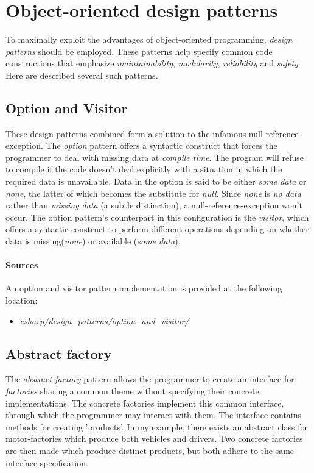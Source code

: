 \documentclass{article}
\begin{document}
\newpage


\section{Object-oriented design patterns}
To maximally exploit the advantages of object-oriented programming, {\em design patterns} should be employed. These patterns
help specify common code constructions that emphasize {\em maintainability}, {\em modularity}, {\em reliability} and
{\em safety}. Here are described several such patterns.

\subsection{Option and Visitor}
These design patterns combined form a solution to the infamous null-reference-exception. The {\em option} pattern offers a
syntactic construct that forces the programmer to deal with missing data at {\em compile time}. The program will refuse to
compile if the code doesn't deal explicitly with a situation in which the required data is unavailable. Data in the option
is said to be either {\em some data} or {\em none}, the latter of which becomes the substitute for {\em null}. Since {\em none}
is {\em no data} rather than {\em missing data} (a subtle distinction), a null-reference-exception won't occur. The option
pattern's counterpart in this configuration is the {\em visitor}, which offers a syntactic construct to perform different
operations depending on whether data is missing({\em none}) or available ({\em some data}).

\begin{samepage}
  \paragraph{Sources}
  An option and visitor pattern implementation is provided at the following location:
  \begin{itemize}
  \item{{\em csharp/design\_patterns/option\_and\_visitor/}}
  \end{itemize}
\end{samepage}


\subsection{Abstract factory}
The {\em abstract factory} pattern allows the programmer to create an interface for {\em factories} sharing a common
theme without specifying their concrete implementations. The concrete factories implement this common interface, through
which the programmer may interact with them. The interface contains methods for creating 'products'. In my example, there
exists an abstract class for motor-factories which produce both vehicles and drivers. Two concrete factories are then
made which produce distinct products, but both adhere to the same interface specification.
\end{document}
